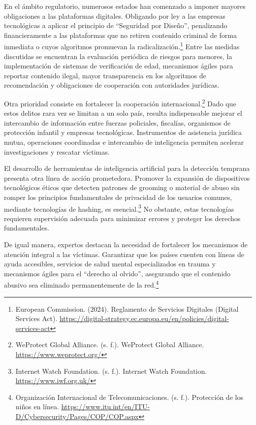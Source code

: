 En el ámbito regulatorio, numerosos estados han comenzado a imponer mayores obligaciones a las plataformas digitales. Obligando por ley a las empresas tecnológicas a aplicar el principio de “Seguridad por Diseño”, penalizando financieramente a las plataformas que no retiren contenido criminal de forma inmediata o cuyos algoritmos promuevan la radicalización.\footnote{European Commission. (2024). Reglamento de Servicios Digitales (Digital Services Act). \url{https://digital-strategy.ec.europa.eu/en/policies/digital-services-act}} Entre las medidas discutidas se encuentran la evaluación periódica de riesgos para menores, la implementación de sistemas de verificación de edad, mecanismos ágiles para reportar contenido ilegal, mayor transparencia en los algoritmos de recomendación y obligaciones de cooperación con autoridades jurídicas.

Otra prioridad consiste en fortalecer la cooperación internacional.\footnote{WeProtect Global Alliance. (s. f.). WeProtect Global Alliance. \url{https://www.weprotect.org/}} Dado que estos delitos rara vez se limitan a un solo país, resulta indispensable mejorar el intercambio de información entre fuerzas policiales, fiscalías, organismos de protección infantil y empresas tecnológicas. Instrumentos de asistencia jurídica mutua, operaciones coordinadas e intercambio de inteligencia permiten acelerar investigaciones y rescatar víctimas.

El desarrollo de herramientas de inteligencia artificial para la detección temprana presenta otra línea de acción prometedora. Promover la expansión de dispositivos tecnológicos éticos que detecten patrones de grooming o material de abuso sin romper los principios fundamentales de privacidad de los usuarios comunes, mediante tecnologías de hashing, es esencial.\footnote{Internet Watch Foundation. (s. f.). Internet Watch Foundation. \url{https://www.iwf.org.uk/}} No obstante, estas tecnologías requieren supervisión adecuada para minimizar errores y proteger los derechos fundamentales.

De igual manera, expertos destacan la necesidad de fortalecer los mecanismos de atención integral a las víctimas. Garantizar que los países cuenten con líneas de ayuda accesibles, servicios de salud mental especializados en trauma y mecanismos ágiles para el “derecho al olvido”, asegurando que el contenido abusivo sea eliminado permanentemente de la red.\footnote{Organización Internacional de Telecomunicaciones. (s. f.). Protección de los niños en línea. \url{https://www.itu.int/en/ITU-D/Cybersecurity/Pages/COP/COP.aspx}}


